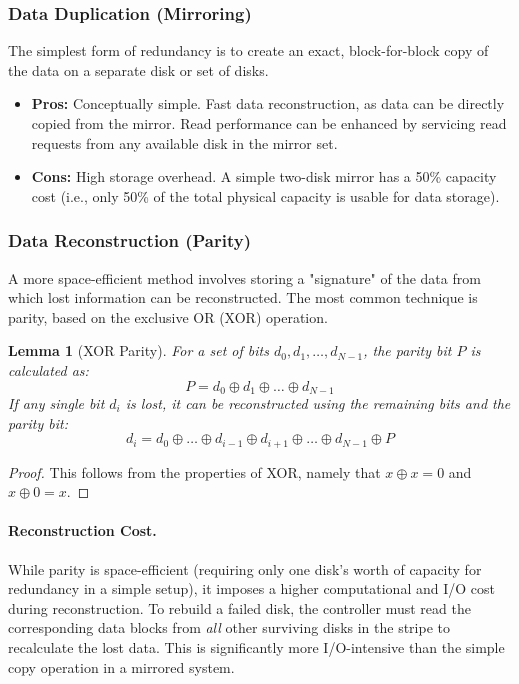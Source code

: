 \documentclass[12pt]{article}
\newtheorem{lemma}[theorem]{Lemma}
\begin{document}
\subsubsection{Data Duplication (Mirroring)}
The simplest form of redundancy is to create an exact, block-for-block copy of the data on a separate disk or set of disks.
\begin{itemize}
    \item \textbf{Pros:} Conceptually simple. Fast data reconstruction, as data can be directly copied from the mirror. Read performance can be enhanced by servicing read requests from any available disk in the mirror set.
    \item \textbf{Cons:} High storage overhead. A simple two-disk mirror has a 50\% capacity cost (i.e., only 50\% of the total physical capacity is usable for data storage).
\end{itemize}

\subsubsection{Data Reconstruction (Parity)}
A more space-efficient method involves storing a "signature" of the data from which lost information can be reconstructed. The most common technique is parity, based on the exclusive OR (XOR) operation.

\begin{lemma}[XOR Parity]
For a set of bits $d_0, d_1, \dots, d_{N-1}$, the parity bit $P$ is calculated as:
\begin{equation}
    P = d_0 \oplus d_1 \oplus \dots \oplus d_{N-1}
\end{equation}
If any single bit $d_i$ is lost, it can be reconstructed using the remaining bits and the parity bit:
\begin{equation}
    d_i = d_0 \oplus \dots \oplus d_{i-1} \oplus d_{i+1} \oplus \dots \oplus d_{N-1} \oplus P
\end{equation}
\end{lemma}
\begin{proof}
This follows from the properties of XOR, namely that $x \oplus x = 0$ and $x \oplus 0 = x$.
\end{proof}

\paragraph{Reconstruction Cost.} While parity is space-efficient (requiring only one disk's worth of capacity for redundancy in a simple setup), it imposes a higher computational and I/O cost during reconstruction. To rebuild a failed disk, the controller must read the corresponding data blocks from \textit{all} other surviving disks in the stripe to recalculate the lost data. This is significantly more I/O-intensive than the simple copy operation in a mirrored system.
\end{document}
